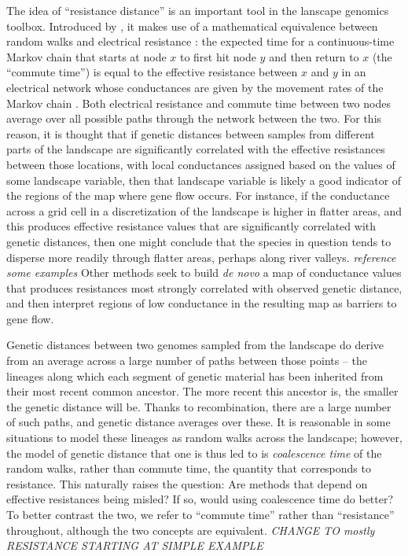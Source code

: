 \documentclass{article}
\newcommand{\plr}[1]{{\em \color{blue} #1}}
\begin{document}
The idea of ``resistance distance'' is an important tool in the lanscape genomics toolbox.
Introduced by \citet{mcrae},
it makes use of a mathematical equivalence between random walks and electrical resistance
\citep{resistance}:
the expected time for a continuous-time Markov chain that starts at node $x$
to first hit node $y$ and then return to $x$ (the ``commute time'')
is equal to the effective resistance between $x$ and $y$ in an electrical network
whose conductances are given by the movement rates of the Markov chain \citep{levin}.
Both electrical resistance and commute time between two nodes
average over all possible paths through the network between the two.
For this reason, it is thought that if genetic distances between samples
from different parts of the landscape
are significantly correlated with the effective resistances between those locations,
with local conductances assigned based on the values of some landscape variable,
then that landscape variable is likely a good indicator of the regions of the map 
where gene flow occurs.
For instance,
if the conductance across a grid cell in a discretization of the landscape
is higher in flatter areas,
and this produces effective resistance values 
that are significantly correlated with genetic distances,
then one might conclude that the species in question tends to disperse more readily through flatter areas,
perhaps along river valleys.
\plr{reference some examples}
Other methods \citep{eems} seek to build \emph{de novo} 
a map of conductance values that produces resistances 
most strongly correlated with observed genetic distance,
and then interpret regions of low conductance in the resulting map as barriers to gene flow.

Genetic distances between two genomes sampled from the landscape
do derive from an average across a large number of paths between those points --
the lineages along which each segment of genetic material has been inherited
from their most recent common ancestor.
The more recent this ancestor is,
the smaller the genetic distance will be.
Thanks to recombination, there are a large number of such paths, 
and genetic distance averages over these.
It is reasonable in some situations to model these lineages as random walks across the landscape;
however, the model of genetic distance that one is thus led to
is \emph{coalescence time} of the random walks, 
rather than commute time, the quantity that corresponds to resistance.
This naturally raises the question: 
Are methods that depend on effective resistances being misled?
If so, would using coalescence time do better?
To better contrast the two,
we refer to ``commute time'' rather than ``resistance'' throughout,
although the two concepts are equivalent.
\plr{CHANGE TO mostly RESISTANCE STARTING AT SIMPLE EXAMPLE}
\end{document}
